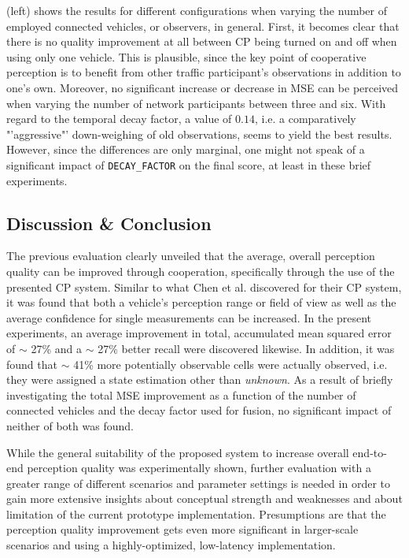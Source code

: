  (left) shows the results for different configurations when varying the number of employed connected vehicles, or observers, in general. First, it becomes clear that there is no quality improvement at all between CP being turned on and off when using only one vehicle. This is plausible, since the key point of cooperative perception is to benefit from other traffic participant's observations in addition to one's own. Moreover, no significant increase or decrease in MSE can be perceived when varying the number of network participants between three and six. With regard to the temporal decay factor, a value of $0.14$, i.e. a comparatively "'aggressive"' down-weighing of old observations, seems to yield the best results. However, since the differences are only marginal, one might not speak of a significant impact of \texttt{DECAY\_FACTOR} on the final score, at least in these brief experiments.

\subsection{Discussion \& Conclusion}
\label{subsec:evaluation:perception_evaluation:discussion_conclusion}
The previous evaluation clearly unveiled that the average, overall perception quality can be improved through cooperation, specifically through the use of the presented CP system. Similar to what Chen et al. \cite{Chen2019} discovered for their CP system, it was found that both a vehicle's perception range or field of view as well as the average confidence for single measurements can be increased. In the present experiments, an average improvement in total, accumulated mean squared error of $\sim$ 27\% and a $\sim$ 27\% better recall were discovered likewise. In addition, it was found that $\sim$ 41\% more potentially observable cells were actually observed, i.e. they were assigned a state estimation other than \textit{unknown}. As a result of briefly investigating the total MSE improvement as a function of the number of connected vehicles and the decay factor used for fusion, no significant impact of neither of both was found.

While the general suitability of the proposed system to increase overall end-to-end perception quality was experimentally shown, further evaluation with a greater range of different scenarios and parameter settings is needed in order to gain more extensive insights about conceptual strength and weaknesses and about limitation of the current prototype implementation. Presumptions are that the perception quality improvement gets even more significant in larger-scale scenarios and using a highly-optimized, low-latency implementation.

